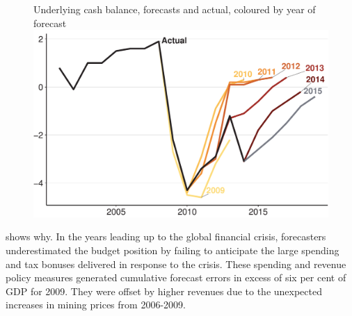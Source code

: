 \documentclass[twoside,english]{Dianab5ona4portrait}
\begin{document}
\begin{figure}
%
{Underlying cash balance, forecasts and actual, coloured by year of forecast}
\includegraphics[width=\columnwidth]{Fiscal-challenges/figure/Figure9a-1.pdf}
\end{figure}

 shows why. In the years leading up to the global financial crisis, forecasters underestimated the budget position by failing to anticipate the large spending and tax bonuses delivered in response to the crisis. These spending and revenue policy measures generated cumulative forecast errors in excess of six per cent of GDP for 2009.  They were offset by higher revenues due to the unexpected increases in mining prices from 2006-2009.
\end{document}
